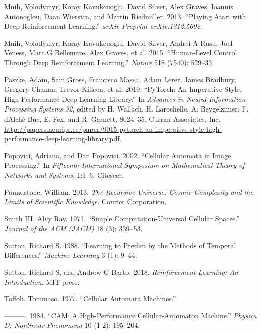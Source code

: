 \documentclass[
  openany]{book}
\newlength{\cslhangindent}
\newenvironment{cslreferences}%
  {\setlength{\parindent}{0pt}%
  \everypar{\setlength{\hangindent}{\cslhangindent}}\ignorespaces}%
  {\par}
\begin{document}
\begin{cslreferences}
\leavevmode\hypertarget{ref-mnih2013playing}{}%
Mnih, Volodymyr, Koray Kavukcuoglu, David Silver, Alex Graves, Ioannis Antonoglou, Daan Wierstra, and Martin Riedmiller. 2013. ``Playing Atari with Deep Reinforcement Learning.'' \emph{arXiv Preprint arXiv:1312.5602}.

\leavevmode\hypertarget{ref-mnih2015human}{}%
Mnih, Volodymyr, Koray Kavukcuoglu, David Silver, Andrei A Rusu, Joel Veness, Marc G Bellemare, Alex Graves, et al. 2015. ``Human-Level Control Through Deep Reinforcement Learning.'' \emph{Nature} 518 (7540): 529--33.

\leavevmode\hypertarget{ref-NEURIPS2019_9015}{}%
Paszke, Adam, Sam Gross, Francisco Massa, Adam Lerer, James Bradbury, Gregory Chanan, Trevor Killeen, et al. 2019. ``PyTorch: An Imperative Style, High-Performance Deep Learning Library.'' In \emph{Advances in Neural Information Processing Systems 32}, edited by H. Wallach, H. Larochelle, A. Beygelzimer, F. d\textquotesingle Alché-Buc, E. Fox, and R. Garnett, 8024--35. Curran Associates, Inc. \url{http://papers.neurips.cc/paper/9015-pytorch-an-imperative-style-high-performance-deep-learning-library.pdf}.

\leavevmode\hypertarget{ref-popovici2002cellular}{}%
Popovici, Adriana, and Dan Popovici. 2002. ``Cellular Automata in Image Processing.'' In \emph{Fifteenth International Symposium on Mathematical Theory of Networks and Systems}, 1:1--6. Citeseer.

\leavevmode\hypertarget{ref-poundstone2013recursive}{}%
Poundstone, William. 2013. \emph{The Recursive Universe: Cosmic Complexity and the Limits of Scientific Knowledge}. Courier Corporation.

\leavevmode\hypertarget{ref-smith1971simple}{}%
Smith III, Alvy Ray. 1971. ``Simple Computation-Universal Cellular Spaces.'' \emph{Journal of the ACM (JACM)} 18 (3): 339--53.

\leavevmode\hypertarget{ref-sutton1988learning}{}%
Sutton, Richard S. 1988. ``Learning to Predict by the Methods of Temporal Differences.'' \emph{Machine Learning} 3 (1): 9--44.

\leavevmode\hypertarget{ref-sutton2018reinforcement}{}%
Sutton, Richard S, and Andrew G Barto. 2018. \emph{Reinforcement Learning: An Introduction}. MIT press.

\leavevmode\hypertarget{ref-toffoli1977cellular}{}%
Toffoli, Tommaso. 1977. ``Cellular Automata Machines.''

\leavevmode\hypertarget{ref-toffoli1984cam}{}%
---------. 1984. ``CAM: A High-Performance Cellular-Automaton Machine.'' \emph{Physica D: Nonlinear Phenomena} 10 (1-2): 195--204.


\end{cslreferences}
\end{document}

